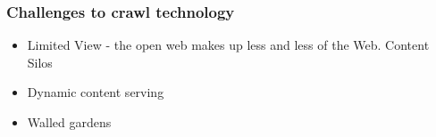 \documentclass[aspectratio=169]{beamer}
\begin{document}
\begin{frame}
\frametitle{Challenges to crawl technology}
\begin{itemize}
\item{Limited View - the open web makes up less and less of the Web. Content Silos}
\item{Dynamic content serving}
\item{Walled gardens}
\end{itemize}
\end{frame}


{
%
\begin{frame}

\end{frame}
}
\end{document}
